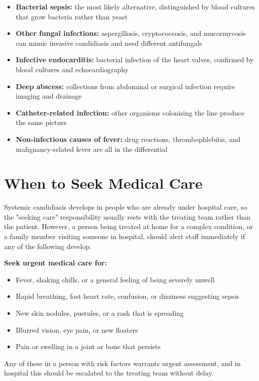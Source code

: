 \begin{itemize}
    \item \textbf{Bacterial sepsis:} the most likely alternative, distinguished by blood cultures that grow bacteria rather than yeast
    \item \textbf{Other fungal infections:} aspergillosis, cryptococcosis, and mucormycosis can mimic invasive candidiasis and need different antifungals
    \item \textbf{Infective endocarditis:} bacterial infection of the heart valves, confirmed by blood cultures and echocardiography
    \item \textbf{Deep abscess:} collections from abdominal or surgical infection require imaging and drainage
    \item \textbf{Catheter-related infection:} other organisms colonising the line produce the same picture
    \item \textbf{Non-infectious causes of fever:} drug reactions, thrombophlebitis, and malignancy-related fever are all in the differential
\end{itemize}

\section*{When to Seek Medical Care}
Systemic candidiasis develops in people who are already under hospital care, so the "seeking care" responsibility usually rests with the treating team rather than the patient. However, a person being treated at home for a complex condition, or a family member visiting someone in hospital, should alert staff immediately if any of the following develop.

\textbf{Seek urgent medical care for:}
\begin{itemize}
    \item Fever, shaking chills, or a general feeling of being severely unwell
    \item Rapid breathing, fast heart rate, confusion, or dizziness suggesting sepsis
    \item New skin nodules, pustules, or a rash that is spreading
    \item Blurred vision, eye pain, or new floaters
    \item Pain or swelling in a joint or bone that persists
\end{itemize}
Any of these in a person with risk factors warrants urgent assessment, and in hospital this should be escalated to the treating team without delay.

